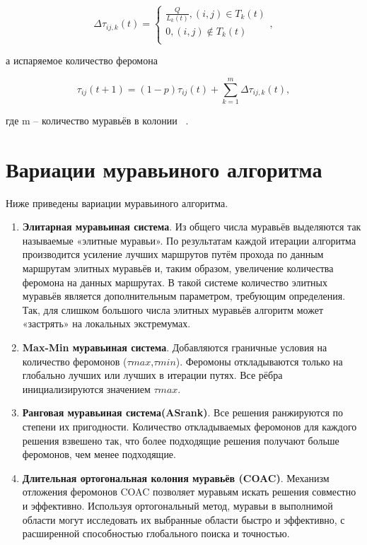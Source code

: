 \documentclass[12pt, a4paper]{report}
\begin{document}
\begin{enumerate}
		\begin{equation}
		\label{formula_dt}
		\Delta \tau_{ij,k}(t) =
		\begin{cases}
		\frac{Q}{L_{k}(t)}, (i, j) \in T_{k}(t)\\
		0, (i, j) \notin T_{k}(t)\\
		\end{cases},
		\end{equation}
		
		а испаряемое количество феромона
		
		\begin{equation}
		\label{formula_dt}
		\tau_{ij}(t+1) = (1-p)\tau_{ij}(t) + \sum\limits_{k=1}^m \Delta \tau_{ij,k}(t),
		\end{equation}
		
		где m – количество муравьёв в колонии ~\cite{aco}.
	\end{enumerate}
	
	\section{Вариации муравьиного алгоритма}
	
	Ниже приведены вариации муравьиного алгоритма.
	\begin{enumerate}
		
		\item \textbf{Элитарная муравьиная система}.
		Из общего числа муравьёв выделяются так называемые «элитные муравьи». По результатам каждой итерации алгоритма производится усиление лучших маршрутов путём прохода по данным маршрутам элитных муравьёв и, таким образом, увеличение количества феромона на данных маршрутах. В такой системе количество элитных муравьёв является дополнительным параметром, требующим определения. Так, для слишком большого числа элитных муравьёв алгоритм может «застрять» на локальных экстремумах.
		
		\item \textbf{Max-Min муравьиная система}.
		Добавляются граничные условия на количество феромонов ($\tau max$,$\tau min$). Феромоны откладываются только на глобально лучших или лучших в итерации путях. Все рёбра инициализируются значением $\tau max$.
		
		\item \textbf{Ранговая муравьиная система(ASrank)}.
		Все решения ранжируются по степени их пригодности. Количество откладываемых феромонов для каждого решения взвешено так, что более подходящие решения получают больше феромонов, чем менее подходящие.
		
		\item \textbf{Длительная ортогональная колония муравьёв (COAC)}.
		Механизм отложения феромонов COAC позволяет муравьям искать решения совместно и эффективно. Используя ортогональный метод, муравьи в выполнимой области могут исследовать их выбранные области быстро и эффективно, с расширенной способностью глобального поиска и точностью.
	\end{enumerate}
\end{document}
